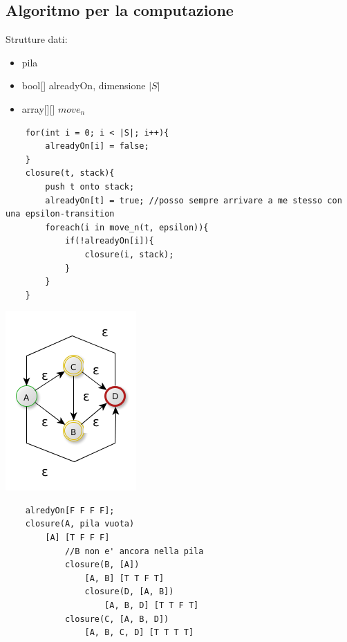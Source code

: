 \subsection{Algoritmo per la computazione}
Strutture dati:
\begin{itemize}
    \item pila\\
    \item bool[] alreadyOn, dimensione $|S|$\\
    \item array[][] $move_n$\\ 
\end{itemize}
\begin{lstlisting}
    for(int i = 0; i < |S|; i++){
        alreadyOn[i] = false;
    }
    closure(t, stack){
        push t onto stack;
        alreadyOn[t] = true; //posso sempre arrivare a me stesso con una epsilon-transition 
        foreach(i in move_n(t, epsilon)){
            if(!alreadyOn[i]){
                closure(i, stack);
            }
        }
    }
\end{lstlisting}

\begin{center}
	\includegraphics[scale=0.5]{Chapters/Img/c02_02.png}\\
\end{center} 

\begin{lstlisting}
    alredyOn[F F F F];
    closure(A, pila vuota)
        [A] [T F F F]
            //B non e' ancora nella pila
            closure(B, [A])
                [A, B] [T T F T]
                closure(D, [A, B])
                    [A, B, D] [T T F T]
            closure(C, [A, B, D])
                [A, B, C, D] [T T T T]
\end{lstlisting}

